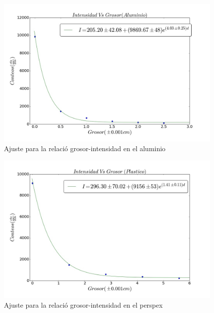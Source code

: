 \documentclass[%
 reprint,
 amsmath,amssymb,
 aps,
]{revtex4-1}
\begin{document}
\begin{figure}[h!]
\centering
\includegraphics[width=1.1\linewidth]{aluminio.jpg}
\caption{Ajuste para la relació grosor-intensidad en el aluminio}
\label{fig:aluminio}
\end{figure}

\begin{figure}[h!]
\centering
\includegraphics[width=1.1\linewidth]{perspex.jpg}
\caption{Ajuste para la relació grosor-intensidad en el perspex}
\label{fig:aluminio}
\end{figure}
\end{document}
